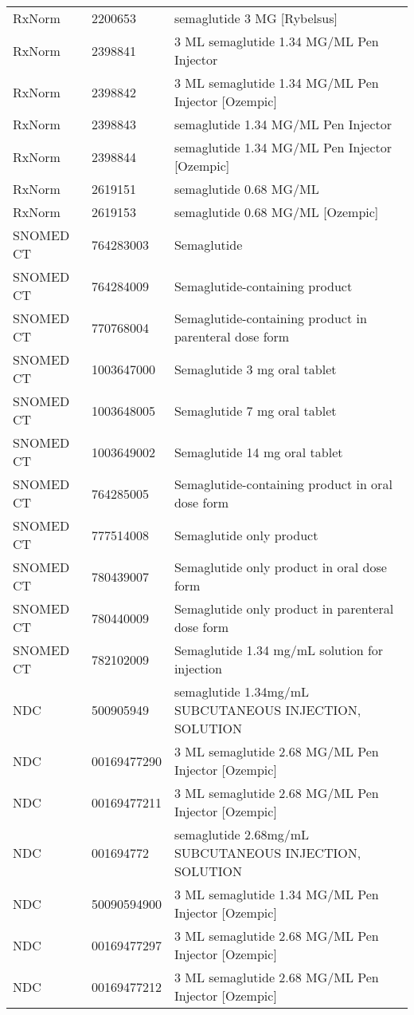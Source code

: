 \begin{longtable}{p{}p{}p{}}
  RxNorm & 2200653 & semaglutide 3 MG [Rybelsus] \\ 
  RxNorm & 2398841 & 3 ML semaglutide 1.34 MG/ML Pen Injector \\ 
  RxNorm & 2398842 & 3 ML semaglutide 1.34 MG/ML Pen Injector [Ozempic] \\ 
  RxNorm & 2398843 & semaglutide 1.34 MG/ML Pen Injector \\ 
  RxNorm & 2398844 & semaglutide 1.34 MG/ML Pen Injector [Ozempic] \\ 
  RxNorm & 2619151 & semaglutide 0.68 MG/ML \\ 
  RxNorm & 2619153 & semaglutide 0.68 MG/ML [Ozempic] \\ 
  SNOMED CT & 764283003 & Semaglutide \\ 
  SNOMED CT & 764284009 & Semaglutide-containing product \\ 
  SNOMED CT & 770768004 & Semaglutide-containing product in parenteral dose form \\ 
  SNOMED CT & 1003647000 & Semaglutide 3 mg oral tablet \\ 
  SNOMED CT & 1003648005 & Semaglutide 7 mg oral tablet \\ 
  SNOMED CT & 1003649002 & Semaglutide 14 mg oral tablet \\ 
  SNOMED CT & 764285005 & Semaglutide-containing product in oral dose form \\ 
  SNOMED CT & 777514008 & Semaglutide only product \\ 
  SNOMED CT & 780439007 & Semaglutide only product in oral dose form \\ 
  SNOMED CT & 780440009 & Semaglutide only product in parenteral dose form \\ 
  SNOMED CT & 782102009 & Semaglutide 1.34 mg/mL solution for injection \\ 
  NDC & 500905949 & semaglutide 1.34mg/mL SUBCUTANEOUS INJECTION, SOLUTION \\ 
  NDC & 00169477290 & 3 ML semaglutide 2.68 MG/ML Pen Injector [Ozempic] \\ 
  NDC & 00169477211 & 3 ML semaglutide 2.68 MG/ML Pen Injector [Ozempic] \\ 
  NDC & 001694772 & semaglutide 2.68mg/mL SUBCUTANEOUS INJECTION, SOLUTION \\ 
  NDC & 50090594900 & 3 ML semaglutide 1.34 MG/ML Pen Injector [Ozempic] \\ 
  NDC & 00169477297 & 3 ML semaglutide 2.68 MG/ML Pen Injector [Ozempic] \\ 
  NDC & 00169477212 & 3 ML semaglutide 2.68 MG/ML Pen Injector [Ozempic] \\ 

\end{longtable}
